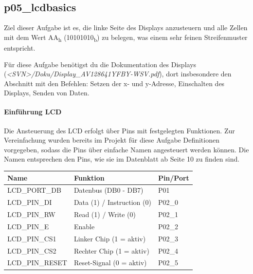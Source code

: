 \subsection{p05\_lcdbasics}
Ziel dieser Aufgabe ist es, die linke Seite des Displays anzusteuern und alle Zellen mit dem Wert AA\textsubscript{h} (10101010\textsubscript{b}) zu belegen, was einem sehr feinen Streifenmuster entspricht.

Für diese Aufgabe benötigst du die Dokumentation des Displays (\textit{<SVN>/Doku/Display\_AV128641YFBY-WSV.pdf}), dort insbesondere den Abschnitt mit den Befehlen: Setzen der x- und y-Adresse, Einschalten des Displays, Senden von Daten.

\paragraph*{Einführung LCD}

Die Ansteuerung des LCD erfolgt über Pins mit festgelegten Funktionen.
Zur Vereinfachung wurden bereits im Projekt für diese Aufgabe Definitionen vorgegeben, sodass die Pins über einfache Namen angesteuert werden können. Die Namen entsprechen den Pins, wie sie im Datenblatt ab Seite 10 zu finden sind.

\begin{center}
	\begin{tabular}{l|l|l}
		\toprule
		\textbf{Name} & \textbf{Funktion} & \textbf{Pin/Port} \\ 
		\midrule
		LCD\_PORT\_DB & Datenbus (DB0 - DB7) & P01 \\ 
		LCD\_PIN\_DI & Data (1) / Instruction (0) & P02\_0 \\ 
		LCD\_PIN\_RW & Read (1) / Write (0) & P02\_1 \\ 
		LCD\_PIN\_E & Enable & P02\_2 \\ 
		LCD\_PIN\_CS1 & Linker Chip (1 = aktiv) & P02\_3 \\ 
		LCD\_PIN\_CS2 & Rechter Chip (1 = aktiv) & P02\_4 \\ 
		LCD\_PIN\_RESET & Reset-Signal (0 = aktiv) & P02\_5 \\ 
		\bottomrule
	\end{tabular}
\end{center}

